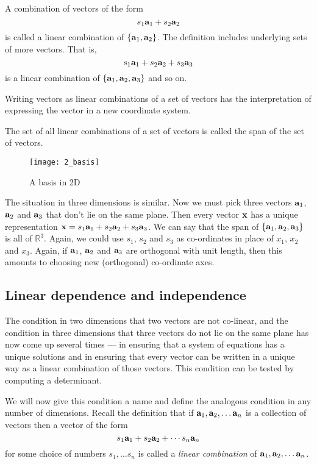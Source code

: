 \begin{definition} 
A combination of vectors of the form 
\[
s_1\aa_1 + s_2\aa_2
\]
is called a {\rm linear combination} of $\{ \aa_1, \aa_2 \}$. The definition includes underlying sets of more vectors. That is, 
\[
s_1\aa_1 + s_2\aa_2 + s_3 \aa_3 
\]
is a linear combination of $\{ \aa_1, \aa_2, \aa_3 \}$ and so on. 
\end{definition} 
Writing vectors as linear combinations of a set of vectors has the interpretation of expressing the vector in a new coordinate system. 

\begin{definition} 
The set of all linear combinations of a set of vectors is called the {\rm span} of the set of vectors. 
\end{definition}

\begin{figure}
\centerline{\texttt{[image: 2\_basis]}}
\caption{A basis in 2D \label{fig_basis}}
\end{figure}

The situation in three dimensions is similar. Now we must pick three vectors
$\aa_1$, $\aa_2$ and $\aa_3$ that don't lie on the same plane. Then every
vector
$\xx$ has a unique representation $\xx=s_1\aa_1+s_2\aa_2+s_3\aa_3$. We can say that the 
span of $\{ \aa_1, \aa_2, \aa_3 \}$ is all of $\mathbb{R}^3$. Again,
we could use $s_1$, $s_2$ and $s_3$ as co-ordinates in place of $x_1$, $x_2$ and
$x_3$. Again, if $\aa_1$, $\aa_2$ and $\aa_3$ are orthogonal with unit length,
then this amounts to choosing new (orthogonal) co-ordinate axes. 

\subsection{Linear dependence and independence}
\label{s:independence}

The condition in two dimensions that two vectors are not co-linear, and the 
condition in three dimensions that three vectors do not lie on the same plane
has now come up several times --- in ensuring that a system of equations has a
unique solutions and in ensuring that every vector can be written in a unique
way as a linear combination of those vectors. This condition can be tested by
computing a determinant.

We will now give this condition a name and define the analogous condition in
any number of dimensions.
Recall the definition that if $\aa_1, \aa_2, \ldots \aa_n$ is a collection of
vectors then a vector of the form 
\[
s_1\aa_1 + s_2\aa_2 + \cdots s_n\aa_n
\]
for
some choice of numbers $s_1, \ldots s_n$ is called a
{\it linear combination} of $\aa_1, \aa_2, \ldots \aa_n$.

